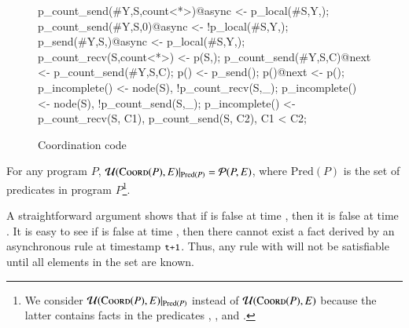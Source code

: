 \begin{figure}[h!]
\label{fig:coordcode}
\begin{Dedalus}
p_count_send(#Y,S,count<*>)@async <- p_local(#S,Y,);
p_count_send(#Y,S,0)@async <- !p_local(#S,Y,\dbar{_});
p_send(#Y,S,)@async <- p_local(#S,Y,);
p_count_recv(S,count<*>) <- p(S,);
p_count_send(#Y,S,C)@next <- p_count_send(#Y,S,C);
p() <- p_send();
p()@next <- p();
p_incomplete() <- node(S), !p_count_recv(S,_);
p_incomplete() <- node(S), !p_count_send(S,_);
p_incomplete() <- p_count_recv(S, C1),
                  p_count_send(S, C2), C1 < C2;
\end{Dedalus}
\caption{Coordination code}
\end{figure}

\begin{theorem}
For any program $P$, $\mathcal{U}(\textsc{Coord}(P), E)|_{\text{Pred}(P)} = \mathcal{P}(P, E)$, where $\text{Pred}(P)$ is the set of predicates in program $P$\footnote{We consider $\mathcal{U}(\textsc{Coord}(P), E)|_{\text{Pred}(P)}$ instead of $\mathcal{U}(\textsc{Coord}(P), E)$ because the latter contains facts in the predicates , , and .}.
\end{theorem}

A straightforward argument shows that if  is false at time , then it is false at time .  It is easy to see if  is false at time , then there cannot exist a  fact derived by an asynchronous rule at timestamp $\dedalus{t+1}$.  Thus, any rule with  will not be satisfiable until all elements in the  set are known.
